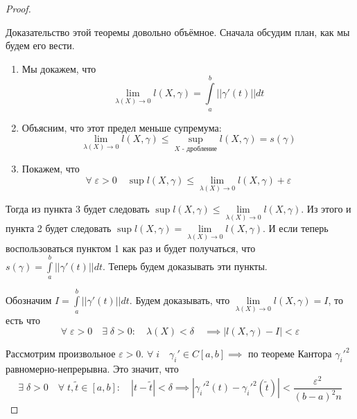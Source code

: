 \documentclass[../main.tex]{subfiles}
\begin{document}
\begin{proof}
    
    ~

    Доказательство этой теоремы довольно объёмное. Сначала обсудим план, как мы будем его вести. 

    \begin{enumerate}
        \item Мы докажем, что 
        \[ \lim\limits_{ \lambda\left( X\right) \rightarrow0 } l \left( X, \gamma \right) = \displaystyle\int\limits_{ a}^{ b} \left| \left| \gamma '\left( t\right)\right|\right|dt\]
        \item Объясним, что этот предел меньше супремума:
        \[ \lim\limits_{ \lambda \left( X\right)\rightarrow 0} l \left( X, \gamma \right) \leq \sup\limits_{ X\text{ - дробление}} l \left( X, \gamma \right)=s\left( \gamma \right)\]
        \item Покажем, что 
        \[ \forall \; \varepsilon >0\quad \sup\limits_{ } l \left( X, \gamma \right) \leq \lim\limits_{ \lambda \left( X\right)\rightarrow 0} l \left( X, \gamma \right)+ \varepsilon \]
    \end{enumerate}

    Тогда из пункта 3 будет следовать \( \sup\limits_{ } l \left( X, \gamma \right) \leq \lim\limits_{ \lambda \left( X\right)\rightarrow 0} l \left( X, \gamma \right)\). Из этого и пункта 2 будет следовать \( \sup\limits_{ } l \left( X, \gamma \right) = \lim\limits_{ \lambda \left( X\right)\rightarrow 0} l \left( X, \gamma \right)\). И если теперь воспользоваться пунктом 1 как раз и будет получаться, что \( s\left( \gamma \right)= \displaystyle\int\limits_{ a}^{ b} \left| \left| \gamma '\left( t\right)\right|\right|dt\). Теперь будем доказывать эти пункты. 

    Обозначим \( I= \displaystyle\int\limits_{ a}^{ b} \left| \left| \gamma '\left( t\right)\right|\right|dt\). Будем доказывать, что \( \lim\limits_{ \lambda \left( X\right)\rightarrow0} l \left( X, \gamma \right)=I\), то есть что
    \[ \forall \; \varepsilon >0\quad \exists \; \delta >0:\quad \lambda \left( X\right) < \delta\quad \implies \left| l \left( X, \gamma \right)-I\right|< \varepsilon \]

    Рассмотрим произвольное \( \varepsilon >0\). \( \forall \; i\quad \gamma _i' \in C\left[ a,b\right] \implies \) по теореме Кантора \( \gamma _i'^2\) равномерно-непрерывна. Это значит, что \[ \exists \; \delta >0\quad \forall \; t, \tilde{ t} \in \left[ a,b\right]:\quad \left| t- \tilde{ t}\right|< \delta\implies \left| \gamma _i'^2\left( t\right)- \gamma _i'^2( \tilde{ t})\right| < \dfrac{ \varepsilon^2}{ (b-a)^2n} \]


\end{proof}
\end{document}
